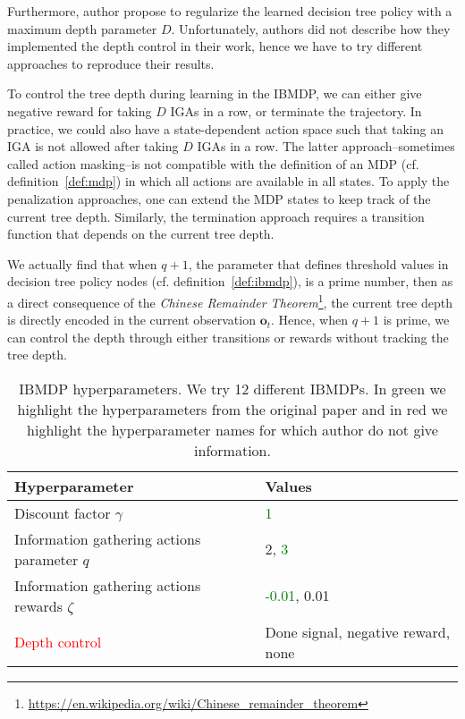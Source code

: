 Furthermore, author propose to regularize the learned decision tree policy with a maximum depth parameter $D$.
Unfortunately, authors did not describe how they implemented the depth control in their work, hence we have to try different approaches to reproduce their results.

To control the tree depth during learning in the IBMDP, we can either give negative reward for taking $D$ IGAs in a row, or terminate the trajectory.
In practice, we could also have a state-dependent action space such that taking an IGA is not allowed after taking $D$ IGAs in a row.
The latter approach--sometimes called action masking--is not compatible with the definition of an MDP (cf. definition~\ref{def:mdp}) in which all actions are available in all states. 
To apply the penalization approaches, one can extend the MDP states to keep track of the current tree depth.
Similarly, the termination approach requires a transition function that depends on the current tree depth.

We actually find that when $q+1$, the parameter that defines threshold values in decision tree policy nodes (cf. definition~\ref{def:ibmdp}), is a prime number, then as a direct consequence of the \textit{Chinese Remainder Theorem}\footnote{\url{https://en.wikipedia.org/wiki/Chinese_remainder_theorem}}, the current tree depth is directly encoded in the current observation $\boldsymbol{o}_t$. 
Hence, when $q+1$ is prime, we can control the depth through either transitions or rewards without tracking the tree depth.

\begin{table}[H]
    \centering
    \caption{IBMDP hyperparameters. We try 12 different IBMDPs. In green we highlight the hyperparameters from the original paper and in red we highlight the hyperparameter names for which author do not give information.}\label{tab:ibmdp-params}
    \begin{tabular}{ll}
    \toprule
    \textbf{Hyperparameter} & \textbf{Values}\\
    \midrule
    Discount factor $\gamma$ & \textcolor{green}{1} \\
    Information gathering actions parameter $q$ & 2, \textcolor{green}{3} \\
    Information gathering actions rewards $\zeta$ & \textcolor{green}{-0.01}, 0.01 \\
    \textcolor{red}{Depth control} & Done signal, negative reward, none \\ 
    \bottomrule
    \end{tabular}
    \end{table}

